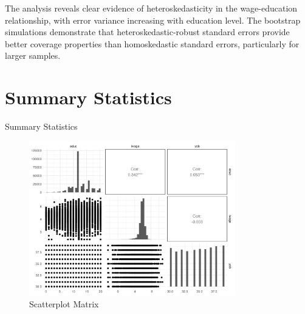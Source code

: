 \documentclass[12pt]{article}
\begin{document}
The analysis reveals clear evidence of heteroskedasticity in the wage-education relationship, with error variance increasing with education level. The bootstrap simulations demonstrate that heteroskedastic-robust standard errors provide better coverage properties than homoskedastic standard errors, particularly for larger samples.


\appendix
\setcounter{figure}{0}                      
\setcounter{table}{0}                      
\renewcommand\thefigure{A.\arabic{figure}} 
\renewcommand\thetable{A.\arabic{table}} 


\section{Summary Statistics}
\begin{table}
    \centering
    \tiny
    
    \caption{\label{tab:summary_stats}Summary Statistics}
\end{table}


\begin{figure}[h]
    \centering
    \includegraphics[width=0.8\textwidth]{output/scatterplot_matrix.png}
    \caption{\label{fig:scatterplot_matrix}Scatterplot Matrix}
\end{figure}
\end{document}
